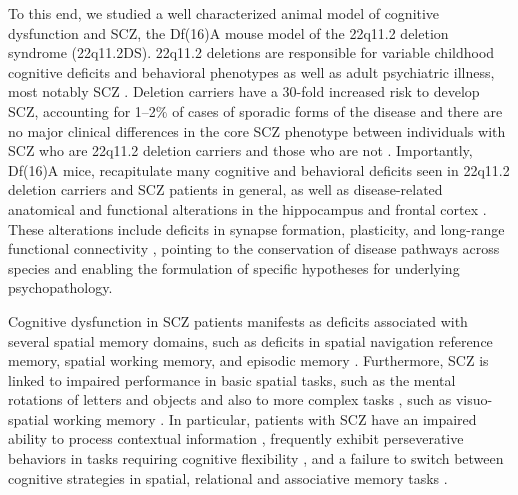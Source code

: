 To this end, we studied a well characterized animal model of cognitive dysfunction and SCZ, the Df(16)A\super{+/-} mouse model of the 22q11.2 deletion syndrome (22q11.2DS). 22q11.2 deletions are responsible for variable childhood cognitive deficits and behavioral phenotypes as well as adult psychiatric illness, most notably SCZ \citep{Biswas2016, Schneider2014}. Deletion carriers have a 30-fold increased risk to develop SCZ, accounting for 1–2$\%$ of cases of sporadic forms of the disease \citep{Karayiorgou2010, Xu2008} and there are no major clinical differences in the core SCZ phenotype between individuals with SCZ who are 22q11.2 deletion carriers and those who are not \citep{Bassett2003}\citep{Bassett1998}. Importantly, Df(16)A\super{+/-} mice, recapitulate many cognitive and behavioral deficits seen in 22q11.2 deletion carriers and SCZ patients in general, as well as disease-related anatomical and functional alterations in the hippocampus and frontal cortex \citep{Glausier2013}\citep{Scariati2016}\citep{Schmitt2015}\citep{Schmitt2016}\citep{Spencer2004}\citep{Uhlhaas2010}\citep{Weinberger2016}. These alterations include deficits in synapse formation, plasticity, and long-range functional connectivity \citep{Drew2011b}\citep{Mukai2008}\citep{Stark2008}\citep{Fenelon2013}\citep{Mukai2015}\citep{Sigurdsson2010}\citep{Tamura2016}, pointing to the conservation of disease pathways across species and enabling the formulation of specific hypotheses for underlying psychopathology.

Cognitive dysfunction in SCZ patients manifests as deficits associated with several spatial memory domains, such as deficits in spatial navigation reference memory, spatial working memory, and episodic memory \citep{Hanlon2006}\citep{Piskulic2007}\citep{Ranganath2008}\citep{Schaefer2013}\citep{Wilkins2013}. Furthermore, SCZ is linked to impaired performance in basic spatial tasks, such as the mental rotations of letters and objects \citep{DeVignemont2006} and also to more complex tasks \citep{Landgraf2011}\citep{Weniger2008}, such as visuo-spatial working memory \citep[see review][]{Piskulic2007}. In particular, patients with SCZ have an impaired ability to process contextual information \citep{Barch2003}\citep{Cohen1999}\citep{Maren2013}, frequently exhibit perseverative behaviors in tasks requiring cognitive flexibility \citep{Crider1997}\citep{Leeson2009}\citep{Morice1990}, and a failure to switch between cognitive strategies in spatial, relational and associative memory tasks \citep{Armstrong2012}\citep{Hanlon2006}\citep{Sheffield2012}\citep{Wilkins2013}.

